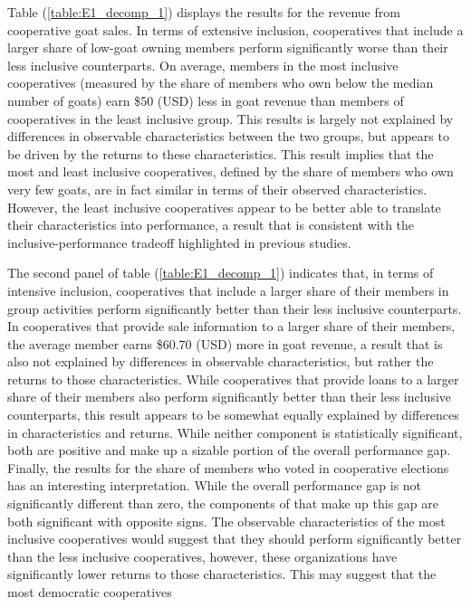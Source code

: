 \documentclass[11pt]{article}
\begin{document}
Table (\ref{table:E1_decomp_1}) displays the results for the revenue from cooperative goat sales. In terms of extensive inclusion, cooperatives that include a larger share of low-goat owning members perform significantly worse than their less inclusive counterparts. On average, members in the most inclusive cooperatives (measured by the share of members who own below the median number of goats) earn \$50 (USD) less in goat revenue than members of cooperatives in the least inclusive group. This results is largely not explained by differences in observable characteristics between the two groups, but appears to be driven by the returns to these characteristics. This result implies that the most and least inclusive cooperatives, defined by the share of members who own very few goats, are in fact similar in terms of their observed characteristics. However, the least inclusive cooperatives appear to be better able to translate their characteristics into performance, a result that is consistent with the inclusive-performance tradeoff highlighted in previous studies. 

The second panel of table (\ref{table:E1_decomp_1}) indicates that, in terms of intensive inclusion, cooperatives that include a larger share of their members in group activities perform significantly better than their less inclusive counterparts. In cooperatives that provide sale information to a larger share of their members, the average member earns \$60.70 (USD) more in goat revenue, a result that is also not explained by differences in observable characteristics, but rather the returns to those characteristics. While cooperatives that provide loans to a larger share of their members also perform significantly better than their less inclusive counterparts, this result appears to be somewhat equally explained by differences in characteristics and returns. While neither component is statistically significant, both are positive and make up a sizable portion of the overall performance gap. Finally, the results for the share of members who voted in cooperative elections has an interesting interpretation. While the overall performance gap is not significantly different than zero, the components of that make up this gap are both significant with opposite signs. The observable characteristics of the most inclusive cooperatives would suggest that they should perform significantly better than the less inclusive cooperatives, however, these organizations have significantly lower returns to those characteristics. This may suggest that the most democratic cooperatives
\end{document}
